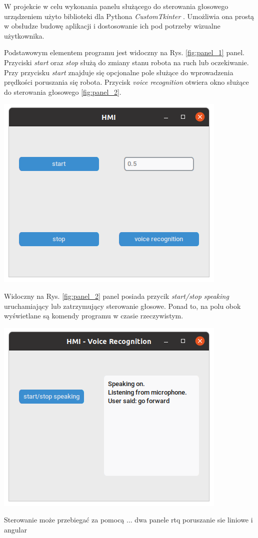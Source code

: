 W projekcie w celu wykonania panelu służącego do sterowania głosowego urządzeniem użyto biblioteki dla Pythona \textit{CustomTkinter} \cite{ctk}. Umożliwia ona prostą w obsłudze budowę aplikacji i dostosowanie ich pod potrzeby wizualne użytkownika. 

Podstawowym elementem programu jest widoczny na Rys. \ref{fig:panel_1} panel. Przyciski \textit{start} oraz \textit{stop} służą do zmiany stanu robota na ruch lub oczekiwanie. Przy przycisku \textit{start} znajduje się opcjonalne pole służące do wprowadzenia prędkości poruszania się robota. Przycisk \textit{voice recognition} otwiera okno służące do sterowania głosowego \ref{fig:panel_2}.
\begin{center}
    \includegraphics[width=0.95\linewidth]{files/panel_1.png}
    \label{fig:panel_1}
\end{center}

Widoczny na Rys. \ref{fig:panel_2} panel posiada przycik \textit{start/stop speaking} uruchamiający lub zatrzymujący sterowanie głosowe. Ponad to, na polu obok wyświetlane są komendy programu w czasie rzeczywistym. 

\begin{center}
    \includegraphics[width=0.95\linewidth]{files/panel_2.png}
    \label{fig:panel_2}
\end{center}

Sterowanie może przebiegać za pomocą ...
dwa panele
rtq
poruszanie sie liniowe i angular